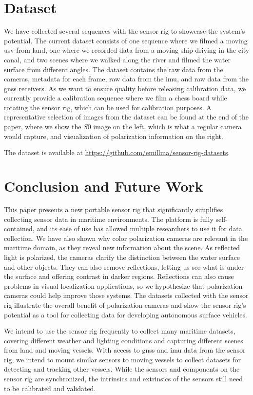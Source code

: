 

\section{Dataset}
We have collected several sequences with the sensor rig to showcase the system's potential.
The current dataset consists of one sequence where we filmed a moving \gls{usv} from land, one where we recorded data from a moving ship driving in the city canal, and two scenes where we walked along the river and filmed the water surface from different angles.
The dataset contains the raw data from the cameras, metadata for each frame, raw data from the \gls{imu}, and raw data from the \gls{gnss} receivers.
As we want to ensure quality before releasing calibration data, we currently provide a calibration sequence where we film a chess board while rotating the sensor rig, which can be used for calibration purposes.
A representative selection of images from the dataset can be found at the end of the paper, where we show the $S0$ image on the left, which is what a regular camera would capture, and visualization of polarization information on the right.

The dataset is available at \url{https://github.com/emillma/sensor-rig-datasets}.

\section{Conclusion and Future Work}
This paper presents a new portable sensor rig that significantly simplifies collecting sensor data in maritime environments.
The platform is fully self-contained, and its ease of use has allowed multiple researchers to use it for data collection.
We have also shown why color polarization cameras are relevant in the maritime domain, as they reveal new information about the scene.
As reflected light is polarized, the cameras clarify the distinction between the water surface and other objects. 
They can also remove reflections, letting us see what is under the surface and offering contrast in darker regions.
Reflections can also cause problems in visual localization applications, so we hypothesize that polarization cameras could help improve those systems.
The datasets collected with the sensor rig illustrate the overall benefit of polarization cameras and show the sensor rig's potential as a tool for collecting data for developing autonomous surface vehicles.

We intend to use the sensor rig frequently to collect many maritime datasets, covering different weather and lighting conditions and capturing different scenes from land and moving vessels.
With access to \gls{gnss} and \gls{imu} data from the sensor rig, we intend to mount similar sensors to moving vessels to collect datasets for detecting and tracking other vessels.
While the sensors and components on the sensor rig are synchronized, the intrinsics and extrinsics of the sensors still need to be calibrated and validated.

